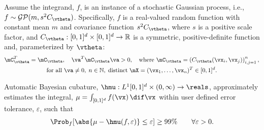 Assume the integrand, $f$, is an instance of a stochastic Gaussian process, i.e., $f \sim \mathcal{GP}(m,s^2 C_{\vtheta})$.  Specifically, $f$ is a real-valued random function with constant mean $m$ and covariance function $s^2C_{\vtheta}$, where $s$ is a positive scale factor, and $C_{\vtheta}: [0,1]^d \times [0,1]^d \to \mathbb{R} $ is a symmetric, positive-definite function and, parameterized by $\vtheta$:
\begin{multline} \label{FJH:eq:CondPosDef}
\mC_{\vtheta}^T = \mC_{\vtheta},  \quad {\va^T} \mC_{\vtheta} {\va} > 0, \quad \text{where }  \mC_{\vtheta} = \left(  C_{\vtheta}({\vx}_i,{\vx}_j)  \right)_{i,j=1}^n, \\
\text{for all } {\va} \ne 0, \;
n\in \mathbb{N}, \; \text{distinct} \; \mX = ({\vx}_1, \ldots, {\vx}_n)^T \in [0,1]^d.
\end{multline}

Automatic Bayesian cubature, $\hmu: L^1[0,1]^d \times (0,\infty) \to \reals$, approximately estimates the integral, $\mu = \int_{[0,1]^d} f(\vx) \, \dif \vx$ within user defined error tolerance, $\varepsilon$, 
 such that 
\[
{\Prob_f  [ }\abs{ \mu - \hmu(f,\varepsilon)} \le \varepsilon 
{ ] \ge 99\%} \qquad \forall \varepsilon > 0.
\]

